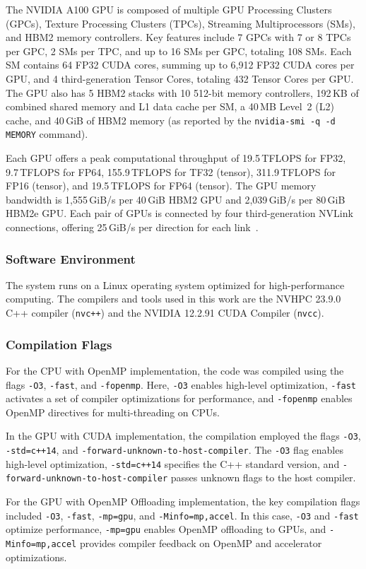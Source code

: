 The NVIDIA A100 GPU is composed of multiple GPU Processing Clusters (GPCs), Texture Processing Clusters (TPCs), Streaming Multiprocessors (SMs), and HBM2 memory controllers. Key features include 7 GPCs with 7 or 8 TPCs per GPC, 2 SMs per TPC, and up to 16 SMs per GPC, totaling 108 SMs. Each SM contains 64 FP32 CUDA cores, summing up to 6,912 FP32 CUDA cores per GPU, and 4 third-generation Tensor Cores, totaling 432 Tensor Cores per GPU. The GPU also has 5 HBM2 stacks with 10 512-bit memory controllers, 192\,KB of combined shared memory and L1 data cache per SM, a 40\,MB Level~2 (L2) cache, and 40\,GiB of HBM2 memory (as reported by the \texttt{nvidia-smi -q -d MEMORY} command).

Each GPU offers a peak computational throughput of 19.5\,TFLOPS for FP32, 9.7\,TFLOPS for FP64, 155.9\,TFLOPS for TF32 (tensor), 311.9\,TFLOPS for FP16 (tensor), and 19.5\,TFLOPS for FP64 (tensor). The GPU memory bandwidth is 1,555\,GiB/s per 40\,GiB HBM2 GPU and 2,039\,GiB/s per 80\,GiB HBM2e GPU. Each pair of GPUs is connected by four third-generation NVLink connections, offering 25\,GiB/s per direction for each link~\cite{nersc_perlmutter_architecture,nvidia_ampere_architecture_whitepaper}.

\subsubsection{Software Environment}

The system runs on a Linux operating system optimized for high-performance computing. The compilers and tools used in this work are the NVHPC 23.9.0 C++ compiler (\texttt{nvc++}) and the NVIDIA 12.2.91 CUDA Compiler (\texttt{nvcc}).

\subsubsection{Compilation Flags}

For the CPU with OpenMP implementation, the code was compiled using the flags \texttt{-O3}, \texttt{-fast}, and \texttt{-fopenmp}. Here, \texttt{-O3} enables high-level optimization, \texttt{-fast} activates a set of compiler optimizations for performance, and \texttt{-fopenmp} enables OpenMP directives for multi-threading on CPUs.

In the GPU with CUDA implementation, the compilation employed the flags \texttt{-O3}, \texttt{-std=c++14}, and \texttt{-forward-unknown-to-host-compiler}. The \texttt{-O3} flag enables high-level optimization, \texttt{-std=c++14} specifies the C++ standard version, and \texttt{-forward-unknown-to-host-compiler} passes unknown flags to the host compiler.

For the GPU with OpenMP Offloading implementation, the key compilation flags included \texttt{-O3}, \texttt{-fast}, \texttt{-mp=gpu}, and \texttt{-Minfo=mp,accel}. In this case, \texttt{-O3} and \texttt{-fast} optimize performance, \texttt{-mp=gpu} enables OpenMP offloading to GPUs, and \texttt{-Minfo=mp,accel} provides compiler feedback on OpenMP and accelerator optimizations.